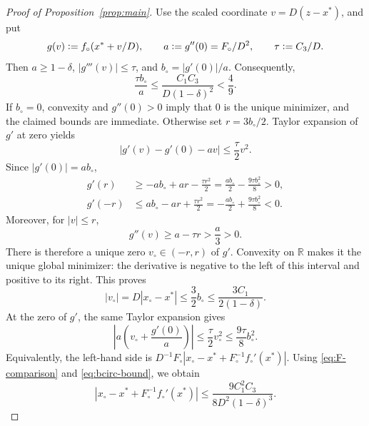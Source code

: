 \documentclass[11pt]{article}
\newcommand{\R}{\mathbb{R}}
\newcommand{\eqdef}{\mathrel{\vcentcolon=}}
\newcommand{\IFP}{F_{\circ}}
\newcommand{\DFN}{D}
\newcommand{\fp}{f_{\circ}}
\newcommand{\xs}{x^{*}}
\newcommand{\xp}{x_{\circ}}
\begin{document}
\begin{proof}[Proof of Proposition~\ref{prop:main}]
Use the scaled coordinate \(v=D(z-x^*)\), and put
\begin{equation}
  g(v)\eqdef f_\circ(x^*+v/D),\qquad
  a\eqdef g''(0)=F_\circ/D^2,\qquad
  \tau\eqdef C_3/D.
  \label{eq:scaled-objective}
\end{equation}
Then \(a\geq1-\delta\), \(|g'''(v)|\leq\tau\), and
\(b_\circ=|g'(0)|/a\).  Consequently,
\begin{equation}
  \frac{\tau b_\circ}{a}
  \leq\frac{C_1C_3}{D(1-\delta)^2}<\frac49.
  \label{eq:scaled-smallness}
\end{equation}
If \(b_\circ=0\), convexity and \(g''(0)>0\) imply that \(0\) is the unique
minimizer, and the claimed bounds are immediate.  Otherwise set
\(r=3b_\circ/2\).  Taylor expansion of \(g'\) at zero yields
\[
  |g'(v)-g'(0)-av|\leq\frac{\tau}{2}v^2.
\]
Since \(|g'(0)|=ab_\circ\),
\begin{align*}
  g'(r)&\geq-ab_\circ+ar-\frac{\tau r^2}{2}
       =\frac{ab_\circ}{2}-\frac{9\tau b_\circ^2}{8}>0,\\
  g'(-r)&\leq ab_\circ-ar+\frac{\tau r^2}{2}
       =-\frac{ab_\circ}{2}+\frac{9\tau b_\circ^2}{8}<0.
\end{align*}
Moreover, for \(|v|\leq r\),
\[
  g''(v)\geq a-\tau r>\frac a3>0.
\]
There is therefore a unique zero \(v_\circ\in(-r,r)\) of \(g'\).
Convexity on \(\R\) makes it the unique global minimizer: the derivative is
negative to the left of this interval and positive to its right.  This proves
\begin{equation}
  |v_\circ|=D|x_\circ-x^*|\leq\frac32b_\circ
  \leq\frac{3C_1}{2(1-\delta)}.
  \label{eq:scalar-localization}
\end{equation}
At the zero of \(g'\), the same Taylor expansion gives
\begin{equation}
  \left|a\left(v_\circ+\frac{g'(0)}a\right)\right|
  \leq\frac{\tau}{2}v_\circ^2
  \leq\frac{9\tau}{8}b_\circ^2.
  \label{eq:scalar-remainder}
\end{equation}
Equivalently, the left-hand side is
\(D^{-1}F_\circ|x_\circ-x^*+F_\circ^{-1}f_\circ'(x^*)|\).
Using \eqref{eq:F-comparison} and \eqref{eq:bcirc-bound}, we obtain
\begin{equation}
  \left|\xp-\xs+\IFP^{-1}\fp'(\xs)\right|
  \leq
  \frac{9C_1^2C_3}{8\DFN^2(1-\delta)^3}.
  \label{eq:Fcirc-remainder}
\end{equation}


\end{proof}
\end{document}
